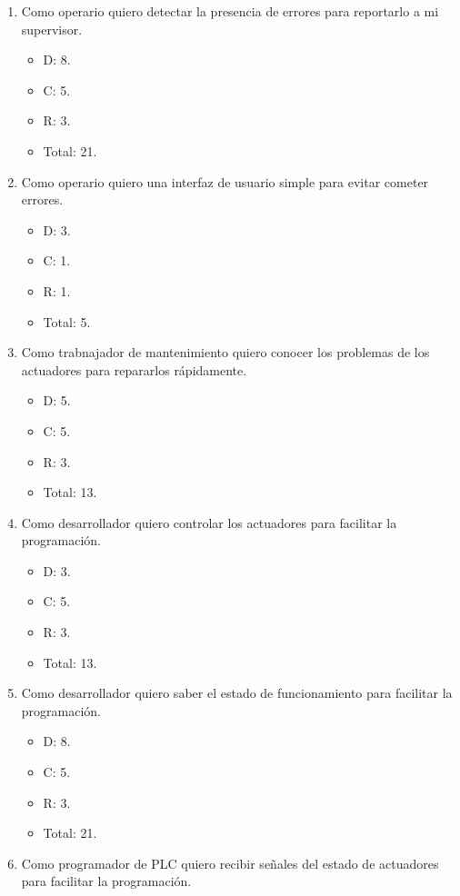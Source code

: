 \documentclass[
11pt, %
]{charter}
\begin{document}
\begin{enumerate}
	\item Como operario quiero detectar la presencia de errores para reportarlo a mi supervisor.
	\begin{itemize}
		\item D: 8.
		\item C: 5.
		\item R: 3.
		\item Total: 21.
	\end{itemize}
	\item Como operario quiero una interfaz de usuario simple para evitar cometer errores.
	\begin{itemize}
		\item D: 3.
		\item C: 1.
		\item R: 1.
		\item Total: 5.
	\end{itemize}
	\item Como trabnajador de mantenimiento quiero conocer los problemas de los actuadores para repararlos rápidamente.
	\begin{itemize}
		\item D: 5.
		\item C: 5.
		\item R: 3.
		\item Total: 13.
	\end{itemize}
	\item Como desarrollador quiero controlar los actuadores para facilitar la programación.
	\begin{itemize}
		\item D: 3.
		\item C: 5.
		\item R: 3.
		\item Total: 13.
	\end{itemize}
	\item Como desarrollador quiero saber el estado de funcionamiento para facilitar la programación.
	\begin{itemize}
		\item D: 8.
		\item C: 5.
		\item R: 3.
		\item Total: 21.
	\end{itemize}
	\item Como programador de PLC quiero recibir señales del estado de actuadores para facilitar la programación.
	\begin{itemize}

\end{itemize}
\end{enumerate}
\end{document}
